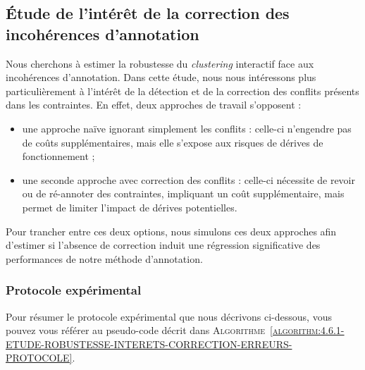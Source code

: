 	
	\subsection{Étude de l'intérêt de la correction des incohérences d'annotation}
	\label{section:4.6.1-ETUDE-ROBUSTESSE-INTERETS-CORRECTION-ERREURS}
		
		Nous cherchons à estimer la robustesse du \textit{clustering} interactif face aux incohérences d'annotation.
		Dans cette étude, nous nous intéressons plus particulièrement à l'intérêt de la détection et de la correction des conflits présents dans les contraintes.
		En effet, deux approches de travail s'opposent :
		\begin{itemize}
			\item une approche naïve ignorant simplement les conflits : celle-ci n'engendre pas de coûts supplémentaires, mais elle s'expose aux risques de dérives de fonctionnement ;
			\item une seconde approche avec correction des conflits : celle-ci nécessite de revoir ou de ré-annoter des contraintes, impliquant un coût supplémentaire, mais permet de limiter l'impact de dérives potentielles.
		\end{itemize}
		Pour trancher entre ces deux options, nous simulons ces deux approches afin d'estimer si l'absence de correction induit une régression significative des performances de notre méthode d'annotation.
	
		\subsubsection{Protocole expérimental}
			
			Pour résumer le protocole expérimental que nous décrivons ci-dessous, vous pouvez vous référer au pseudo-code décrit dans \textsc{Algorithme~\ref{algorithm:4.6.1-ETUDE-ROBUSTESSE-INTERETS-CORRECTION-ERREURS-PROTOCOLE}}.
			
